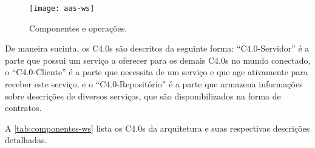 \begin{figure}[htb]
	\centering
	\texttt{[image: aas-ws]}
	\caption{Componentes e operações.}
	\label{fig:aas-ws}
\end{figure}

De maneira sucinta, os C4.0s são descritos da seguinte forma: ``C4.0-Servidor'' é a parte que possui um serviço a oferecer para os demais C4.0s no mundo conectado, o ``C4.0-Cliente'' é a parte que necessita de um serviço e que age ativamente para receber este serviço, e o ``C4.0-Repositório'' é a parte que armazena informações sobre descrições de diversos serviços, que são disponibilizados na forma de contratos.

A \autoref{tab:componentes-ws} lista os C4.0s da arquitetura e suas respectivas descrições detalhadas.

